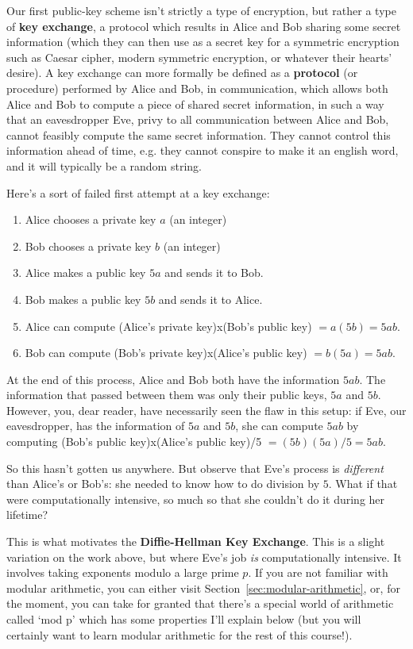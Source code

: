 \documentclass{article}
\theoremstyle{plain}
\theoremstyle{definition}
\theoremstyle{remark}
\numberwithin{theorem}{section}
\begin{document}
Our first public-key scheme isn't strictly a type of encryption, but rather a type of \textbf{key exchange}, a protocol which results in Alice and Bob sharing some secret information (which they can then use as a secret key for a symmetric encryption such as Caesar cipher, modern symmetric encryption, or whatever their hearts' desire).  A key exchange can more formally be defined as a \textbf{protocol} (or procedure) performed by Alice and Bob, in communication, which allows both Alice and Bob to compute a piece of shared secret information, in such a way that an eavesdropper Eve, privy to all communication between Alice and Bob, cannot feasibly compute the same secret information.  They cannot control this information ahead of time, e.g. they cannot conspire to make it an english word, and it will typically be a random string.

Here's a sort of failed first attempt at a key exchange:

\begin{enumerate}
	\item Alice chooses a private key $a$ (an integer)
	\item Bob chooses a private key $b$ (an integer)
	\item Alice makes a public key $5a$ and sends it to Bob.
	\item Bob makes a public key $5b$ and sends it to Alice.
	\item Alice can compute (Alice's private key)x(Bob's public key) $= a(5b) = 5ab$.
	\item Bob can compute (Bob's private key)x(Alice's public key) $= b(5a) = 5ab$.
\end{enumerate}

At the end of this process, Alice and Bob both have the information $5ab$.  The information that passed between them was only their public keys, $5a$ and $5b$.  However, you, dear reader, have necessarily seen the flaw in this setup:  if Eve, our eavesdropper, has the information of $5a$ and $5b$, she can compute $5ab$ by computing (Bob's public key)x(Alice's public key)/5 $= (5b)(5a)/5 = 5ab$.

So this hasn't gotten us anywhere.  But observe that Eve's process is \emph{different} than Alice's or Bob's:  she needed to know how to do division by $5$.  What if that were computationally intensive, so much so that she couldn't do it during her lifetime?

This is what motivates the \textbf{Diffie-Hellman Key Exchange}. This is a slight variation on the work above, but where Eve's job \emph{is} computationally intensive.  It involves taking exponents modulo a large prime $p$.  If you are not familiar with modular arithmetic, you can either visit Section~\ref{sec:modular-arithmetic}, or, for the moment, you can take for granted that there's a special world of arithmetic called `mod p' which has some properties I'll explain below (but you will certainly want to learn modular arithmetic for the rest of this course!).
\end{document}
